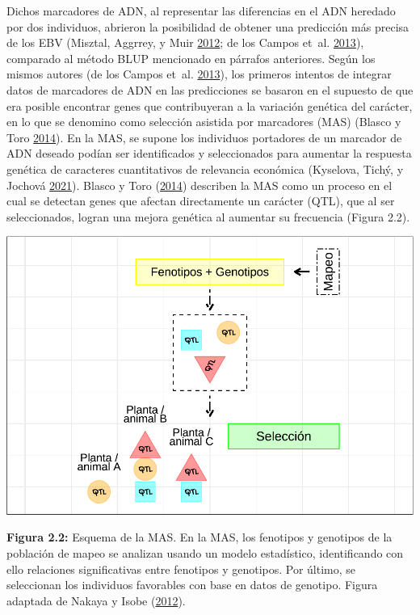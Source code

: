 \documentclass[11pt,spanish,a4paper,oneside,]{book} %
\begin{document}
Dichos marcadores de ADN, al representar las diferencias en el ADN heredado por dos individuos, abrieron la posibilidad de obtener una predicción más precisa de los EBV (Misztal, Aggrrey, y Muir \protect\hyperlink{ref-cite:14}{2012}; de los Campos et~al. \protect\hyperlink{ref-cite:31}{2013}), comparado al método BLUP mencionado en párrafos anteriores. Según los mismos autores (de los Campos et~al. \protect\hyperlink{ref-cite:31}{2013}), los primeros intentos de integrar datos de marcadores de ADN en las predicciones se basaron en el supuesto de que era posible encontrar genes que contribuyeran a la variación genética del carácter, en lo que se denomino como selección asistida por marcadores (MAS) (Blasco y Toro \protect\hyperlink{ref-cite:3}{2014}). En la MAS, se supone los individuos portadores de un marcador de ADN deseado podían ser identificados y seleccionados para aumentar la respuesta genética de caracteres cuantitativos de relevancia económica (Kyselova, Tichý, y Jochová \protect\hyperlink{ref-cite:32}{2021}). Blasco y Toro (\protect\hyperlink{ref-cite:3}{2014}) describen la MAS como un proceso en el cual se detectan genes que afectan directamente un carácter (QTL), que al ser seleccionados, logran una mejora genética al aumentar su frecuencia (Figura 2.2).

\begin{center}\includegraphics[width=1\linewidth]{figures/MAS} \end{center}

\noindent 
\textbf{Figura 2.2:} Esquema de la MAS. En la MAS, los fenotipos y genotipos de la población de mapeo se analizan usando un modelo estadístico, identificando con ello relaciones significativas entre fenotipos y genotipos. Por último, se seleccionan los individuos favorables con base en datos de genotipo. Figura adaptada de Nakaya y Isobe (\protect\hyperlink{ref-cite:6}{2012}).
\end{document}
